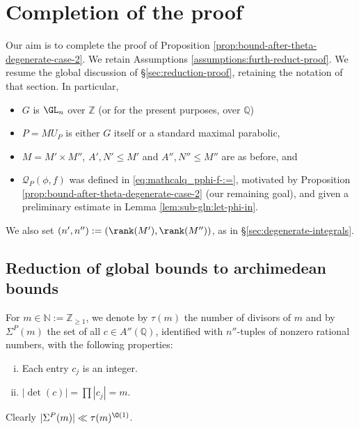 \section{Completion of the proof}\label{sec:completion-proof-1}
Our aim is to complete the proof of Proposition \ref{prop:bound-after-theta-degenerate-case-2}.  We retain Assumptions \ref{assumptions:furth-reduct-proof}.  We resume the global discussion of \S\ref{sec:reduction-proof}, retaining the notation of that section.  In particular,
\begin{itemize}
\item $G$ is $\GL_n$ over $\mathbb{Z}$ (or for the present purposes, over $\mathbb{Q}$)
\item $P = M U_P$ is either $G$ itself or a standard maximal parabolic,
\item $M = M' \times M''$, $A', N' \leq M'$ and $A'', N'' \leq M''$ are as before, and
\item $\mathcal{Q}_P(\phi, f)$ was defined in \eqref{eq:mathcalq_pphi-f-:=}, motivated by Proposition \ref{prop:bound-after-theta-degenerate-case-2} (our remaining goal), and given a preliminary estimate in Lemma \ref{lem:sub-gln:let-phi-in}.
\end{itemize}
We also set $(n', n'') := (\rank(M'), \rank(M''))$, as in \S\ref{sec:degenerate-integrals}.


\subsection{Reduction of global bounds to archimedean bounds}
For $m \in \mathbb{N} := \mathbb{Z}_{\geq 1}$, we denote by $\tau(m)$ the number of divisors of $m$ and by $\Sigma^P(m)$ the set of all $c \in A''(\mathbb{Q})$, identified with $n''$-tuples of nonzero rational numbers, with the following properties:
\begin{enumerate}[(i)]
\item Each entry $c_j$ is an integer.
\item $|\det(c)| = \prod |c_j| = m$.
\end{enumerate}
Clearly $|\Sigma^P(m)| \ll \tau(m)^{\O(1)}$.

